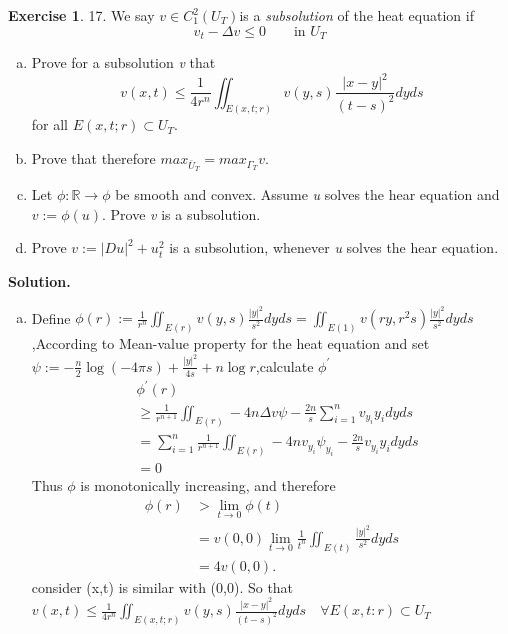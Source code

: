 \documentclass[a4paper]{book}
\newenvironment{solution}%
{\noindent\textbf{Solution.}}%
{\qedhere}
\numberwithin{equation}{chapter}
\theoremstyle{definition}
\newtheorem{exc}[exm]{Exercise}
\begin{document}
\begin{multicols}{2}
\begin{exc}
	17.  We say $ v\in C^2_1 (U_T) $is a \textit{subsolution} of the heat equation if
	\begin{equation}\label{4:4:1}
		v_t - \Delta v \leq 0 \qquad \text{in } U_T
	\end{equation}
	\begin{enumerate}[(a)]
		\item Prove for a subsolution \textit{v} that 
		\begin{equation}\label{4:4:2}
			v(x,t) \leq \frac{1}{4r^n} \iint_{E(x,t;r)} v(y,s) \frac{|x-y|^2}{(t-s)^2}dyds 
		\end{equation}
		for all $ E(x,t;r) \subset U_T. $
		
		\item Prove that therefore $ max_{\bar{U}_T} = max_{\Gamma_T} v. $
		
		\item Let $ \phi : \mathbb{R} \rightarrow \phi $ be smooth and convex. Assume \textit{u} solves the hear equation and $ v:= \phi(u) $. Prove \textit{v} is a subsolution.
		
		\item Prove $ v:= |Du|^2 + u^2_t $ is a subsolution, whenever \textit{u} solves the hear equation.
	\end{enumerate}
\end{exc}

\begin{solution}
	\begin{enumerate}[(a)]
		\item Define $ \phi(r):= \frac{1}{r^n} \iint_{E(r)} v(y,s) \frac{|y|^2}{s^2} dyds = \iint_{E(1)} v(ry, r^2s) \frac{|y|^2}{s^2}dyds $,According to Mean-value property for the heat equation and set $ \psi := -\frac{n}{2} \log(-4\pi s) + \frac{|y|^2}{4s} + n \log{r} $,calculate $ \phi^\prime $
		\begin{align*}
			&\phi^\prime (r)\\
			&\geq \frac{1}{r^{n+1}} \iint_{E(r)}-4n\Delta v \psi - \frac{2n}{s} \sum_{i=1}^{n} v_{y_i}y_i dyds \\
			&=\sum_{i=1}^{n} \frac{1}{r^{n+1}} \iint_{E(r)} -4n  v_{y_i} \psi_{y_i}  - \frac{2n}{s} v_{y_i}y_i dyds \\
			&= 0 
		\end{align*}
		Thus $ \phi $ is monotonically increasing, and therefore
		\begin{align*}
		\phi (r) &> \lim\limits_{t \rightarrow 0} \phi(t) \\
		&= v(0,0)\lim\limits_{t \rightarrow 0} \frac{1}{t^n} \iint_{E(t)} \frac{|y|^2}{s^2}dyds  \\
		&= 4v(0,0).
		\end{align*}
		consider (x,t) is similar with (0,0). So that $ 	v(x,t) \leq \frac{1}{4r^n} \iint_{E(x,t;r)} v(y,s) \frac{|x-y|^2}{(t-s)^2}dyds \quad \forall E(x,t:r) \subset U_T $
		

\end{enumerate}
\end{solution}
\end{multicols}
\end{document}

